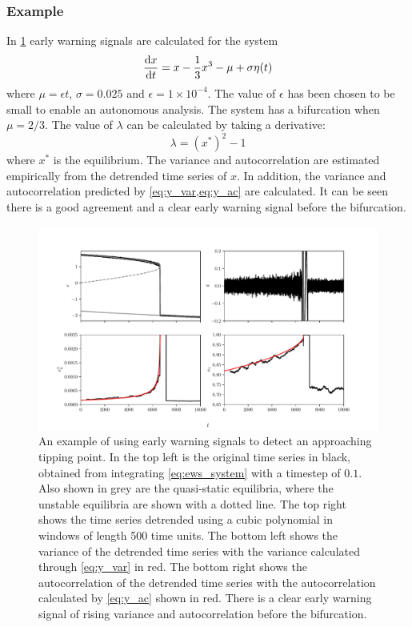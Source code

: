 \subsubsection{Example}
In \cref{fig:ews} early warning signals are calculated for the system
\begin{equation}
  \label{eq:ews_system}
  \dv{x}{t} = x - \frac{1}{3}x^3 - \mu + \sigma \eta(t)
\end{equation}
where $\mu = \epsilon t$, $\sigma = 0.025$ and $\epsilon = 1\times 10^{-4}$. The value of $\epsilon$ has been chosen to be small to enable an autonomous analysis. The system has a bifurcation when $\mu = 2/3$.
The value of $\lambda$ can be calculated by taking a derivative:
\begin{equation}
  \label{eq:ews_lambda}
  \lambda = \left(x^*\right)^2 - 1 
\end{equation}
where $x^*$ is the equilibrium. The variance and autocorrelation are estimated empirically from the detrended time series of $x$. In addition, the variance and
autocorrelation predicted  by \cref{eq:y_var,eq:y_ac} are calculated. It can be seen there is a
good agreement and a clear early warning signal before the bifurcation.
\begin{figure}
  \centering
  \includegraphics[width=\textwidth,keepaspectratio]{ews}
  \caption[An example of an early warning signal]{An example of using early warning signals to detect an approaching tipping point. In the top left is the original time series in black, obtained
    from integrating \cref{eq:ews_system} with a timestep of $0.1$. Also shown in grey are the quasi-static equilibria, where the unstable equilibria are shown with a dotted line.
    The top right shows the time series detrended using a cubic polynomial in windows of length 500 time units.
    The bottom left shows the variance of the detrended time series with the variance calculated through \cref{eq:y_var} in red. The bottom right shows the autocorrelation of the detrended time series
    with the autocorrelation calculated by \cref{eq:y_ac} shown in red. There is a clear early warning signal of rising variance and autocorrelation before the bifurcation.}
  \label{fig:ews}
\end{figure}

